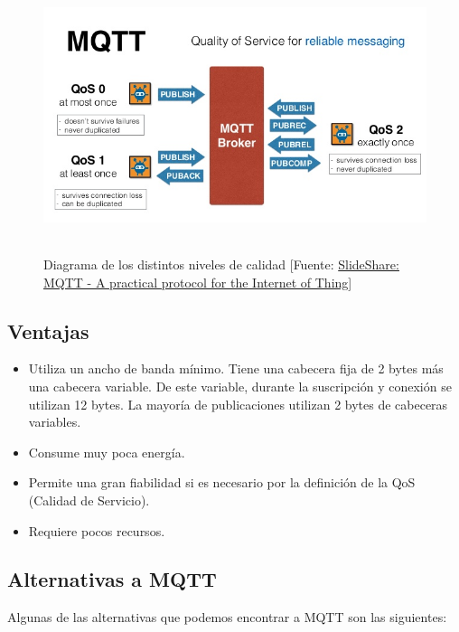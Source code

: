 \begin{figure}[htb]
	\begin{center}
		\includegraphics[height=8cm]{figures/mqtt-qos.jpg}
		\caption{Diagrama de los distintos niveles de calidad [Fuente: \href{https://image.slidesharecdn.com/0xwitjksqnqruoz4tnsi-signature-6a256d24caf5d1fcc6a3bf1d013dfe0e1fa99369a560d140998f50cbdbc6d127-poli-140828123252-phpapp02/95/mqtt-a-practical-protocol-for-the-internet-of-things-15-638.jpg?cb=1409229409}{SlideShare: MQTT - A practical protocol for the Internet of Thing}]}
	\end{center}

	\label{types}
\end{figure}

\subsection{Ventajas}
\begin{itemize}  
\item Utiliza un ancho de banda mínimo. Tiene una cabecera fija de 2 bytes más una cabecera variable. De este variable, durante la suscripción y conexión se utilizan 12 bytes. La mayoría de publicaciones utilizan 2 bytes de cabeceras variables.
\item Consume muy poca energía.
\item Permite una gran fiabilidad si es necesario por la definición de la QoS (Calidad de Servicio).
\item Requiere pocos recursos.
\end{itemize}

\subsection{Alternativas a MQTT}
Algunas de las alternativas que podemos encontrar a MQTT son las siguientes:


